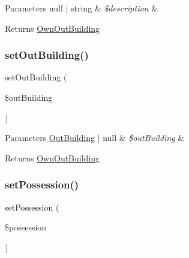 \begin{DoxyParams}[1]{Parameters}
null | string & {\em \$description} & \\
\hline
\end{DoxyParams}
\begin{DoxyReturn}{Returns}
\mbox{\hyperlink{class_app_1_1_entity_1_1_own_out_building}{Own\+Out\+Building}} 
\end{DoxyReturn}
\mbox{\label{class_app_1_1_entity_1_1_own_out_building_a022759bfbde1514bbfcf0d823f056d3a}} 
\subsubsection{\texorpdfstring{setOutBuilding()}{setOutBuilding()}}
{\footnotesize\ttfamily set\+Out\+Building (\begin{DoxyParamCaption}\item[{?\mbox{\hyperlink{class_app_1_1_entity_1_1_out_building}{Out\+Building}}}]{\$out\+Building }\end{DoxyParamCaption})}


\begin{DoxyParams}[1]{Parameters}
\mbox{\hyperlink{class_app_1_1_entity_1_1_out_building}{Out\+Building}} | null & {\em \$out\+Building} & \\
\hline
\end{DoxyParams}
\begin{DoxyReturn}{Returns}
\mbox{\hyperlink{class_app_1_1_entity_1_1_own_out_building}{Own\+Out\+Building}} 
\end{DoxyReturn}
\mbox{\label{class_app_1_1_entity_1_1_own_out_building_ad625cd7a23ddbd219c5f6b58e85f2977}} 
\subsubsection{\texorpdfstring{setPossession()}{setPossession()}}
{\footnotesize\ttfamily set\+Possession (\begin{DoxyParamCaption}\item[{?\mbox{\hyperlink{class_app_1_1_entity_1_1_possession}{Possession}}}]{\$possession }\end{DoxyParamCaption})}


